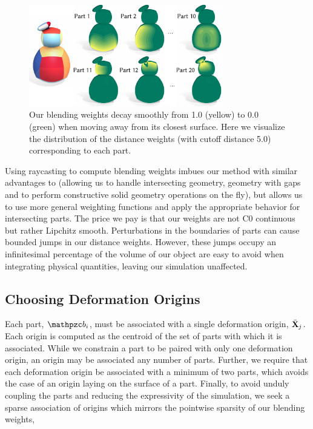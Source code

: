 \begin{figure}[h]
    \centering
    \includegraphics[width=3.33in]{figures/distance_weight_puft.pdf}
    \caption{Our blending weights decay smoothly from 1.0 (yellow) to 0.0 (green) when moving away from its closest surface. Here we visualize the distribution of the distance weights (with cutoff distance 5.0) corresponding to each part.   
    }
    \label{fig:distance_weight_puft}
    \vspace{-5pt}
  \end{figure} 

Using raycasting to compute blending weights imbues our method with similar advantages to \citet{Sawhney:2020:MCG} (allowing us to 
handle intersecting geometry, geometry with gaps and to perform constructive solid geometry operations on the fly),
but allows us to use more general weighting functions and apply the appropriate behavior for intersecting parts.
The price we pay is that our weights are not C0 continuous but rather Lipchitz smooth.
Perturbations in the boundaries of parts can cause bounded jumps in our distance weights. 
However, these jumps occupy an infinitesimal percentage of the volume of our object are easy to avoid when integrating
physical quantities, leaving our simulation unaffected. 

\subsection{Choosing Deformation Origins}
\label{sec:origins}
Each part, $\prt_i$, must be associated with a single deformation origin, $\bar{\mathbf{X}}_j$. 
Each origin is computed as the centroid of the set of parts with which it is associated. 
While we constrain a part to be paired with only one deformation origin, an origin may be associated any number of parts. 
Further, we require that each deformation origin be associated with a minimum of two parts, which avoids the case of an origin laying on the surface of a part. 
Finally, to avoid unduly coupling the parts and reducing the expressivity of the simulation, we seek a sparse association of origins 
which mirrors the pointwise sparsity of our blending weights, 

